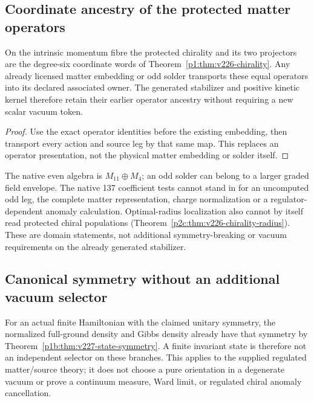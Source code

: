 \documentclass[12pt,a4paper]{article}
\begin{document}
\subsection{Coordinate ancestry of the protected matter operators}
\label{p5:sec:v226-protected-matter}
\begin{corollary}
\label{p5:cor:v226-protected-matter}
On the intrinsic momentum fibre the protected chirality and its two
projectors are the degree-six coordinate words of
Theorem~\ref{p1:thm:v226-chirality}. Any already licensed matter embedding
or odd solder transports these equal operators into its declared associated
owner. The generated stabilizer and positive kinetic kernel therefore retain
their earlier operator ancestry without requiring a new scalar vacuum token.
\end{corollary}
\begin{proof}
Use the exact operator identities before the existing embedding, then
transport every action and source leg by that same map. This replaces an
operator presentation, not the physical matter embedding or solder itself.
\end{proof}
The native even algebra is $M_{11}\oplus M_4$; an odd solder can belong to
a larger graded field envelope. The native 137 coefficient tests cannot
stand in for an uncomputed odd leg, the complete matter representation,
charge normalization or a regulator-dependent anomaly calculation.
Optimal-radius localization also cannot by itself read protected chiral
populations (Theorem~\ref{p2c:thm:v226-chirality-radius}). These are domain
statements, not additional symmetry-breaking or vacuum requirements on the
already generated stabilizer.


\subsection{Canonical symmetry without an additional vacuum selector}
\label{p5a:sec:v227-canonical-symmetry}
For an actual finite Hamiltonian with the claimed unitary symmetry, the
normalized full-ground density and Gibbs density already have that
symmetry by Theorem~\ref{p1b:thm:v227-state-symmetry}. A finite invariant
state is therefore not an independent selector on these branches.
This applies to the supplied regulated matter/source theory; it does not
choose a pure orientation in a degenerate vacuum or prove a continuum
measure, Ward limit, or regulated chiral anomaly cancellation.
\end{document}

